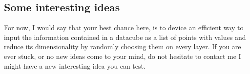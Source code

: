 \documentclass[11pt,fleqn]{book} %
\begin{document}
{																																																																																																																																																																																																																																																																																																	     \subsection{Some interesting ideas}
																																																																																																																																																																																																																																																																																																	     For now, I would say that your best chance here, is to device an efficient way to input the information contained in a datacube as a list of points with values and reduce its dimensionality by randomly choosing them on every layer. If you are ever stuck, or no new ideas come to your mind, do not hesitate to contact me I might have a new interesting idea you can test.

}
\end{document}
